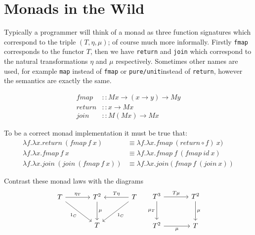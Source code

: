 \section{Monads in the Wild}
Typically a programmer will think of a monad as three function signatures
which correspond to the triple $(T,\eta,\mu)$;
of course much more informally.
Firstly \texttt{fmap} corresponds to the functor $T$,
then we have \texttt{return} and \texttt{join} which correspond to
the natural transformations $\eta$ and $\mu$ respectively.
Sometimes other names are used,
for example \texttt{map} instead of \texttt{fmap}
or \texttt{pure/unit}instead of \texttt{return},
however the semantics are exactly the same.

\begin{equation}
  \begin{split}
    fmap   &:: M x \rightarrow (x \rightarrow y) \rightarrow M y \\
    return &:: x \rightarrow M x                                 \\
    join   &:: M (M x) \rightarrow M x
  \end{split}
\end{equation}

To be a correct monad implementation it must be true that:
\begin{equation}
  \begin{split}
      \lambda f.\lambda x.return\ (fmap\ f\ x)
      &\equiv
      \lambda f.\lambda x.fmap\ (return \circ f)\ x)
      \\
      \lambda f.\lambda x.fmap\ f\ x
      &\equiv
      \lambda f.\lambda x.fmap\ f\ (fmap\ id\ x)
      \\
      \lambda f.\lambda x.join\ (join\ (fmap\ f\ x))
      &\equiv
      \lambda f.\lambda x.join(fmap\ f\ (join\ x))
  \end{split}
\end{equation}

Contrast these monad laws with the diagrams
\begin{equation}
    \begin{tikzcd}[sep=large]
        T \rar{\eta_T} \drar[swap]{1_{C}} & T^2 \dar{\mu} & \lar[swap]{T\eta} \dlar{1_{C}} T \\
                                           & T            &
    \end{tikzcd}
    \quad
    \begin{tikzcd}[sep=large]
        T^3 \rar{T\mu} \dar[swap]{\mu_T} & T^2 \dar{\mu} \\
        T^2 \rar[swap]{\mu}                    & T
    \end{tikzcd}
\end{equation}

